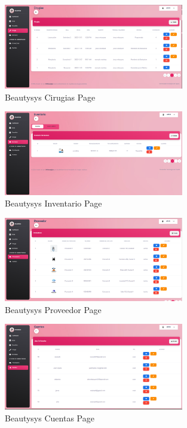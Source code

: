 \documentclass{scrreprt}
\begin{document}
\begin{figure}[H]
    \centering
    \includegraphics[width=0.7\textwidth]{img/Cirugias_home.png}
    \caption{Beautysys Cirugias Page}
\end{figure}

\begin{figure}[H]
    \centering
    \includegraphics[width=0.7\textwidth]{img/Inventario_home.png}
    \caption{Beautysys Inventario Page}
\end{figure}

\begin{figure}[H]
    \centering
    \includegraphics[width=0.7\textwidth]{img/Proveedor_home.png}
    \caption{Beautysys Proveedor Page}
\end{figure}

\begin{figure}[H]
    \centering
    \includegraphics[width=0.7\textwidth]{img/Cuentas_home.png}
    \caption{Beautysys Cuentas Page}
\end{figure}
\end{document}
